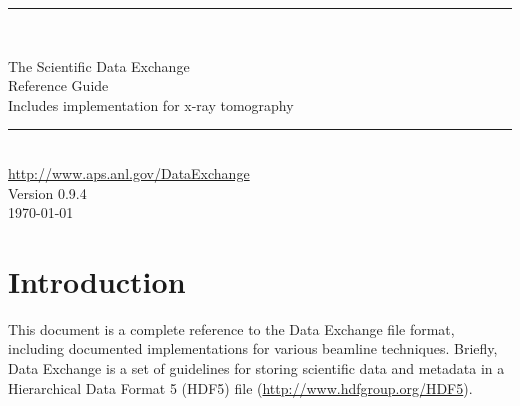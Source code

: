 \documentclass[usletter,11pt]{article}
\newcommand{\HRule}{{\color{brightOrange} \rule{\linewidth}{0.5mm}}}
\begin{document}
\pagestyle{empty}

\begin{center}
\vspace*{2.5cm}

\HRule \\[0.6cm]
\begin{spacing}{2.0}

{\color{softBlue} \Huge \sffamily The Scientific Data Exchange}\\[0.15cm]
{\color{softBlue} \Huge \sffamily Reference Guide}\\[0.15cm]
{\color{softBlue} \sffamily Includes implementation for x-ray tomography}\\[0.15cm]

\end{spacing}
\HRule \\[1.0cm]
{\Large \color{softBlue} \sffamily \url{http://www.aps.anl.gov/DataExchange}}\\[1.0cm]
{\Large \color{softBlue} \sffamily Version 0.9.4}\\[1.0cm]
{\Large \color{softBlue} \sffamily \today}

\end{center}
\newpage


\newpage

\pagestyle{fancy}

\tableofcontents


\newpage

\setcounter{page}{1}

\section{Introduction}

This document is a complete reference to the Data Exchange file format, 
including documented implementations for various beamline techniques. Briefly,
Data Exchange is a set of guidelines for storing scientific data and metadata
in a Hierarchical Data Format 5 (HDF5) file (\url{http://www.hdfgroup.org/HDF5}). 
\end{document}
